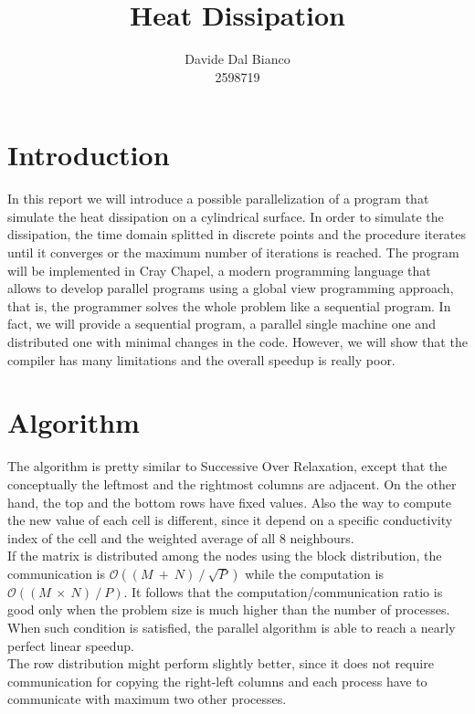 \documentclass{article}
\title{Heat Dissipation}
\author{Davide Dal Bianco \\ 2598719}
\begin{document}
\maketitle

\section{Introduction} \label{sec:introduction}
In this report we will introduce a possible parallelization of a program that simulate the heat dissipation on a cylindrical surface. In order to simulate the dissipation, the time domain splitted in discrete points and the procedure iterates until it converges or the maximum number of iterations is reached. The program will be implemented in Cray Chapel, a modern programming language that allows to develop parallel programs using a global view programming approach, that is, the programmer solves the whole problem like a sequential program. In fact, we will provide a sequential program, a parallel single machine one and distributed one with minimal changes in the code. However, we will show that the compiler has many limitations and the overall speedup is really poor.

\section{Algorithm} \label{sec:algorithm}
The algorithm is pretty similar to Successive Over Relaxation, except that the conceptually the leftmost and the rightmost columns are adjacent. On the other hand, the top and the bottom rows have fixed values. Also the way to compute the new value of each cell is different, since it depend on a specific conductivity index of the cell and the weighted average of all 8 neighbours. \\
If the matrix is distributed among the nodes using the block distribution, the communication is $\mathcal{O}((M~+~N)~/~\sqrt{P})$ while the computation is $\mathcal{O}((M~\times~N)~/~P)$. It follows that the computation/communication ratio is good only when the problem size is much higher than the number of processes. When such condition is satisfied, the parallel algorithm is able to reach a nearly perfect linear speedup. \\
The row distribution might perform slightly better, since it does not require communication for copying the right-left columns and each process have to communicate with maximum two other processes.
\end{document}
